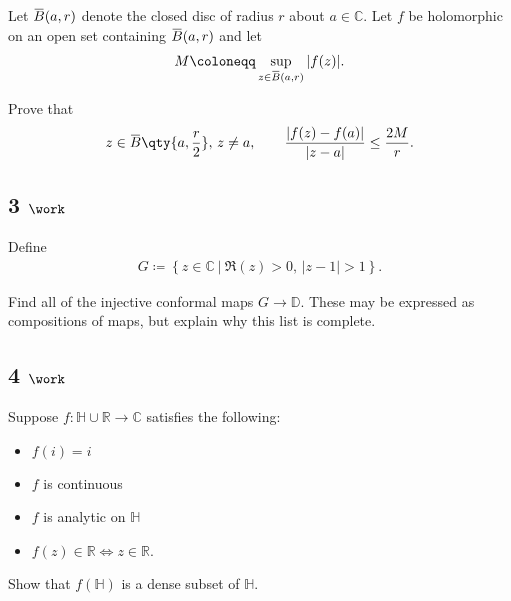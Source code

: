 Let
\(\mkern 1.5mu\overline{\mkern-1.5muB\mkern-1.5mu}\mkern 1.5mu(a, r)\)
denote the closed disc of radius \(r\) about \(a\in {\mathbb{C}}\). Let
\(f\) be holomorphic on an open set containing
\(\mkern 1.5mu\overline{\mkern-1.5muB\mkern-1.5mu}\mkern 1.5mu(a, r)\)
and let
\begin{align*}  
M \coloneqq\sup_{z\in \mkern 1.5mu\overline{\mkern-1.5muB\mkern-1.5mu}\mkern 1.5mu(a, r)} {\left\lvert {f(z)} \right\rvert}
.\end{align*}

Prove that
\begin{align*}  
z\in \mkern 1.5mu\overline{\mkern-1.5muB\mkern-1.5mu}\mkern 1.5mu\qty{a, {r\over 2}},\,z\neq a, \qquad {{\left\lvert { f(z) - f(a)} \right\rvert} \over {\left\lvert {z-a} \right\rvert}} \leq {2M \over r}
.\end{align*}

\hypertarget{work-72}{%
\subsection{\texorpdfstring{3
\(\work\)}{3 \textbackslash work}}\label{work-72}}

Define
\begin{align*}  
G \coloneqq\left\{{z\in {\mathbb{C}}{~\mathrel{\Big|}~}\Re(z) > 0, \, {\left\lvert {z-1} \right\rvert} > 1}\right\}
.\end{align*}

Find all of the injective conformal maps \(G\to {\mathbb{D}}\). These
may be expressed as compositions of maps, but explain why this list is
complete.

\hypertarget{work-73}{%
\subsection{\texorpdfstring{4
\(\work\)}{4 \textbackslash work}}\label{work-73}}

Suppose \(f: {\mathbb{H}}\cup{\mathbb{R}}\to {\mathbb{C}}\) satisfies
the following:

\begin{itemize}
\tightlist
\item
  \(f(i) = i\)
\item
  \(f\) is continuous
\item
  \(f\) is analytic on \({\mathbb{H}}\)
\item
  \(f(z) \in {\mathbb{R}}\iff z\in {\mathbb{R}}\).
\end{itemize}

Show that \(f({\mathbb{H}})\) is a dense subset of \({\mathbb{H}}\).

